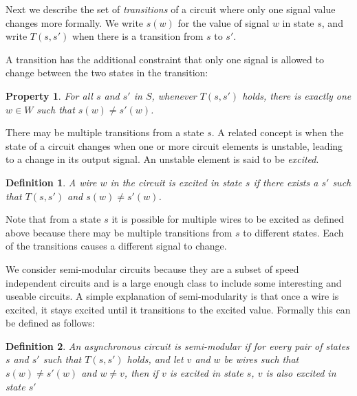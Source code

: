 \documentclass[12pt]{report}
\newtheorem*{definition}{Definition}
\newtheorem*{property}{Property}
\begin{document}
Next we describe the set of {\em transitions} of a circuit where only one signal value changes more formally.  
We write $s(w)$ for the value of signal $w$ in state $s$, and write $T(s, s')$ when there is a transition from $s$ to $s'$.

A transition has the additional constraint that only one signal is allowed to change between the two states in the transition:
\begin{property}For all $s$ and $s'$ in $S$, whenever $T(s,s')$ holds, there is exactly one $w \in W$ such that $s(w)\neq s'(w)$.
\end{property}
There may be multiple transitions from a state $s$.  A related concept is when the state of a circuit changes when one or more circuit elements is unstable, leading to a change in its output signal.  An unstable element is said to be {\em excited}.


\begin{definition}A wire $w$ in the circuit is {\em excited} in state $s$ if there exists a $s'$ such that $T(s,s')$ and $s(w) \neq s'(w)$. %
\end{definition} %

Note that from a state $s$ it is possible for multiple wires to be excited as defined above because there may be multiple transitions from $s$ to different states.  Each of the transitions causes a different signal to change.

We consider semi-modular circuits because they are a subset of speed independent circuits and is a large enough class to include some interesting and useable circuits. A simple explanation of semi-modularity is that once a wire is excited, it stays excited until it transitions to the excited value. Formally this can be defined as follows: %
\begin{definition}An asynchronous circuit is {\em semi-modular} if for every pair of states $s$ and $s'$ such that $T(s,s')$ holds, and let $v$ and $w$ be wires such that $s(w) \neq s'(w)$ and $w\neq v$, then if $v$ is excited in state $s$, $v$ is also excited in state $s'$ \end{definition}
\end{document}
